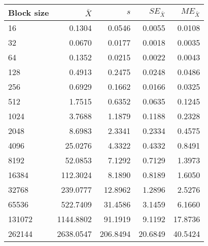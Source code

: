\begin{tabular}{lrrrr}\toprule
{\small Block size} & $\bar{X}$ & $s$ & $SE_{\bar{X}}$ & $ME_{\bar{X}}$ \\\midrule
16 & 0.1304 & 0.0546 & 0.0055 & 0.0108\\
32 & 0.0670 & 0.0177 & 0.0018 & 0.0035\\
64 & 0.1352 & 0.0215 & 0.0022 & 0.0043\\
128 & 0.4913 & 0.2475 & 0.0248 & 0.0486\\
256 & 0.6929 & 0.1662 & 0.0166 & 0.0325\\
512 & 1.7515 & 0.6352 & 0.0635 & 0.1245\\
1024 & 3.7688 & 1.1879 & 0.1188 & 0.2328\\
2048 & 8.6983 & 2.3341 & 0.2334 & 0.4575\\
4096 & 25.0276 & 4.3322 & 0.4332 & 0.8491\\
8192 & 52.0853 & 7.1292 & 0.7129 & 1.3973\\
16384 & 112.3024 & 8.1890 & 0.8189 & 1.6050\\
32768 & 239.0777 & 12.8962 & 1.2896 & 2.5276\\
65536 & 522.7409 & 31.4586 & 3.1459 & 6.1660\\
131072 & 1144.8802 & 91.1919 & 9.1192 & 17.8736\\
262144 & 2638.0547 & 206.8494 & 20.6849 & 40.5424\\
\bottomrule
\end{tabular}
